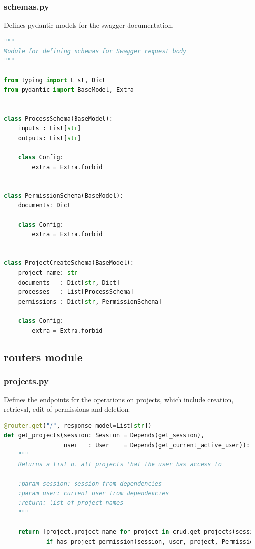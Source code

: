 \documentclass[12pt]{report}
\begin{document}
\subsubsection{schemas.py}

Defines pydantic models for the swagger documentation.

\begin{lstlisting}[language=Python, caption=Schema models]
"""
Module for defining schemas for Swagger request body
"""

from typing import List, Dict
from pydantic import BaseModel, Extra


class ProcessSchema(BaseModel):
    inputs : List[str]
    outputs: List[str]

    class Config:
        extra = Extra.forbid


class PermissionSchema(BaseModel):
    documents: Dict

    class Config:
        extra = Extra.forbid


class ProjectCreateSchema(BaseModel):
    project_name: str
    documents   : Dict[str, Dict]
    processes   : List[ProcessSchema]
    permissions : Dict[str, PermissionSchema]

    class Config:
        extra = Extra.forbid

\end{lstlisting}

\subsection{routers module}

\subsubsection{projects.py}
Defines the endpoints for the operations on projects, which include creation, retrieval, edit of permissions and deletion.

\begin{lstlisting}[language=Python, caption=Permissions]
@router.get("/", response_model=List[str])
def get_projects(session: Session = Depends(get_session),
                 user   : User    = Depends(get_current_active_user)):
    """
    Returns a list of all projects that the user has access to

    :param session: session from dependencies
    :param user: current user from dependencies
    :return: list of project names
    """

    return [project.project_name for project in crud.get_projects(session)
            if has_project_permission(session, user, project, Permissions.view)]
\end{lstlisting}
\end{document}
